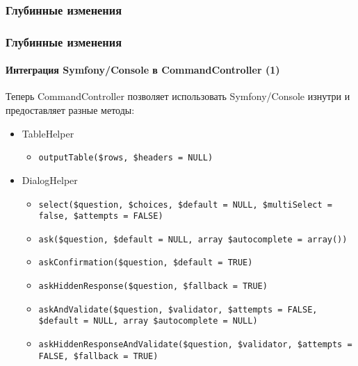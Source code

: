 \begin{frame}[fragile]
	\frametitle{Глубинные изменения}\frametitle{Глубинные изменения}
	\framesubtitle{Интеграция Symfony/Console в CommandController (1)}

	\lstset{basicstyle=\tiny\ttfamily}

	Теперь CommandController позволяет использовать Symfony/Console изнутри и предоставляет разные
	методы:

	\begin{itemize}

		\item \smaller TableHelper
			\begin{itemize}
				\item\smaller\texttt{outputTable(\$rows, \$headers = NULL)}
			\end{itemize}

		\item DialogHelper
			\begin{itemize}
				\item\smaller\texttt{select(\$question, \$choices, \$default = NULL, \$multiSelect = false, \$attempts = FALSE)}
				\item\texttt{ask(\$question, \$default = NULL, array \$autocomplete = array())}
				\item\texttt{askConfirmation(\$question, \$default = TRUE)}
				\item\texttt{askHiddenResponse(\$question, \$fallback = TRUE)}
				\item\texttt{askAndValidate(\$question, \$validator, \$attempts = FALSE, \$default = NULL, array \$autocomplete = NULL)}
				\item\texttt{askHiddenResponseAndValidate(\$question, \$validator, \$attempts = FALSE, \$fallback = TRUE)}
			\end{itemize}

	\end{itemize}

\end{frame}


